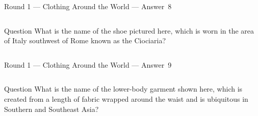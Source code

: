 \documentclass[11pt]{beamer}
\begin{document}
\begin{frame}[t]{Round 1 --- Clothing Around the World --- \mbox{Answer 8}}
\vspace{-0.5em}
\begin{columns}[T,totalwidth=\linewidth]
    \begin{column}{0.6\linewidth}
    \begin{block}{Question}
    What is the name of the shoe pictured here, which is worn in the area of Italy southwest of Rome known as the Ciociaria?
    \end{block}
    \end{column}
    \begin{column}{0.38\linewidth}
    \begin{center}
    \texttt{[image: \{Images/italianshoe]}.jpg}
    \end{center}
    \end{column}
\end{columns}

\end{frame}
\begin{frame}[t]{Round 1 --- Clothing Around the World --- \mbox{Answer 9}}
\vspace{-0.5em}
\begin{columns}[T,totalwidth=\linewidth]
    \begin{column}{0.4\linewidth}
    \begin{block}{Question}
    What is the name of the lower-body garment shown here, which is created from a length of fabric wrapped around the waist and is ubiquitous in Southern and Southeast Asia?
    \end{block}
    \end{column}
    \begin{column}{0.58\linewidth}
    \begin{center}
    \texttt{[image: \{Images/sarong]}.jpg}
    \end{center}
    \end{column}
\end{columns}

\end{frame}
\end{document}
